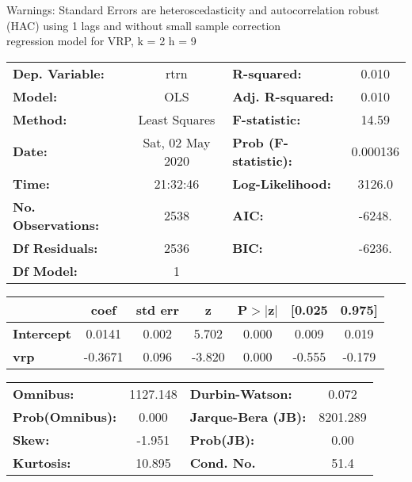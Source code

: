 Warnings: \newline
 [1] Standard Errors are heteroscedasticity and autocorrelation robust (HAC) using 1 lags and without small sample correction\\ 

regression model for VRP, k = 2 h = 9\begin{center}
\begin{tabular}{lclc}
\toprule
\textbf{Dep. Variable:}    &       rtrn       & \textbf{  R-squared:         } &     0.010   \\
\textbf{Model:}            &       OLS        & \textbf{  Adj. R-squared:    } &     0.010   \\
\textbf{Method:}           &  Least Squares   & \textbf{  F-statistic:       } &     14.59   \\
\textbf{Date:}             & Sat, 02 May 2020 & \textbf{  Prob (F-statistic):} &  0.000136   \\
\textbf{Time:}             &     21:32:46     & \textbf{  Log-Likelihood:    } &    3126.0   \\
\textbf{No. Observations:} &        2538      & \textbf{  AIC:               } &    -6248.   \\
\textbf{Df Residuals:}     &        2536      & \textbf{  BIC:               } &    -6236.   \\
\textbf{Df Model:}         &           1      & \textbf{                     } &             \\
\bottomrule
\end{tabular}
\begin{tabular}{lcccccc}
                   & \textbf{coef} & \textbf{std err} & \textbf{z} & \textbf{P$> |$z$|$} & \textbf{[0.025} & \textbf{0.975]}  \\
\midrule
\textbf{Intercept} &       0.0141  &        0.002     &     5.702  &         0.000        &        0.009    &        0.019     \\
\textbf{vrp}       &      -0.3671  &        0.096     &    -3.820  &         0.000        &       -0.555    &       -0.179     \\
\bottomrule
\end{tabular}
\begin{tabular}{lclc}
\textbf{Omnibus:}       & 1127.148 & \textbf{  Durbin-Watson:     } &    0.072  \\
\textbf{Prob(Omnibus):} &   0.000  & \textbf{  Jarque-Bera (JB):  } & 8201.289  \\
\textbf{Skew:}          &  -1.951  & \textbf{  Prob(JB):          } &     0.00  \\
\textbf{Kurtosis:}      &  10.895  & \textbf{  Cond. No.          } &     51.4  \\
\bottomrule
\end{tabular}
\end{center}

